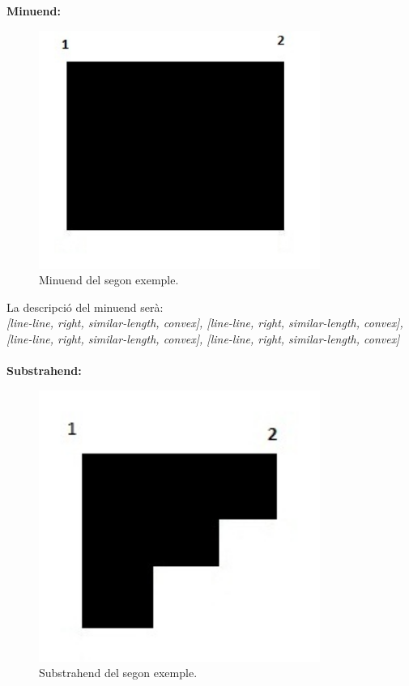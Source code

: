 \documentclass{article}
\begin{document}
{\bf Minuend:}
\begin{figure}[!h]
\centering
\includegraphics[width=260pt]{images/quad_gran.jpg}
\caption {Minuend del segon exemple.}
\label {fig:quad_gran2}
\end{figure}

La descripció del minuend serà:
\\
\emph {[line-line, right, similar-length, convex], [line-line, right, similar-length, convex], [line-line, right, similar-length, convex], [line-line, right, similar-length, convex]}
\\
\\

{\bf Substrahend:}
\begin{figure}[!h]
\centering
\includegraphics[width=260pt]{images/quad_escala.jpg}
\caption {Substrahend del segon exemple.}
\label {fig:quad_escala}
\end{figure}
\end{document}
